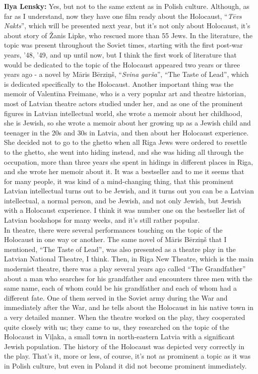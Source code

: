 \textbf{Ilya Lensky:} Yes, but not to the same extent as in Polish culture. Although, as far as I understand, now they have one film ready about the Holocaust, ``\textit{Tēvs Nakts}'', which will be presented next year, but it’s not only about Holocaust, it’s about story of Žanis Lipke, who rescued more than 55 Jews. In the literature, the topic was present throughout the Soviet times, starting with the first post-war years, '48, '49, and up until now, but I think the first work of literature that would be dedicated to the topic of the Holocaust appeared two years or three years ago - a novel by Māris Bērziņš, “\textit{Svina garša}”, ``The Taste of Lead'', which is dedicated specifically to the Holocaust. Another important thing was the memoir of Valentīna Freimane, who is a very popular art and theatre historian, most of Latvian theatre actors studied under her, and as one of the prominent figures in Latvian intellectual world, she wrote a memoir about her childhood, she is Jewish, so she wrote a memoir about her growing up as a Jewish child and teenager in the 20s and 30s in Latvia, and then about her Holocaust experience. She decided not to go to the ghetto when all Riga Jews were ordered to resettle to the ghetto, she went into hiding instead, and she was hiding all through the occupation, more than three years she spent in hidings in different places in Riga, and she wrote her memoir about it. It was a bestseller and to me it seems that for many people, it was kind of a mind-changing thing, that this prominent Latvian intellectual turns out to be Jewish, and it turns out you can be a Latvian intellectual, a normal person, and be Jewish, and not only Jewish, but Jewish with a Holocaust experience. I think it was number one on the bestseller list of Latvian bookshops for many weeks, and it’s still rather popular. \\
In theatre, there were several performances touching on the topic of the Holocaust in one way or another. The same novel of Māris Bērziņš that I mentioned, “The Taste of Lead”, was also presented as a theatre play in the Latvian National Theatre, I think. Then, in Riga New Theatre, which is the main modernist theatre, there was a play several years ago called “The Grandfather” about a man who searches for his grandfather and encounters three men with the same name, each of whom could be his grandfather and each of whom had a different fate. One of them served in the Soviet army during the War and immediately after the War, and he tells about the Holocaust in his native town in a very detailed manner. When the theatre worked on the play, they cooperated quite closely with us; they came to us, they researched on the topic of the Holocaust in Viļaka, a small town in north-eastern Latvia with a significant Jewish population. The history of the Holocaust was depicted very correctly in the play. That’s it, more or less, of course, it’s not as prominent a topic as it was in Polish culture, but even in Poland it did not become prominent immediately.

